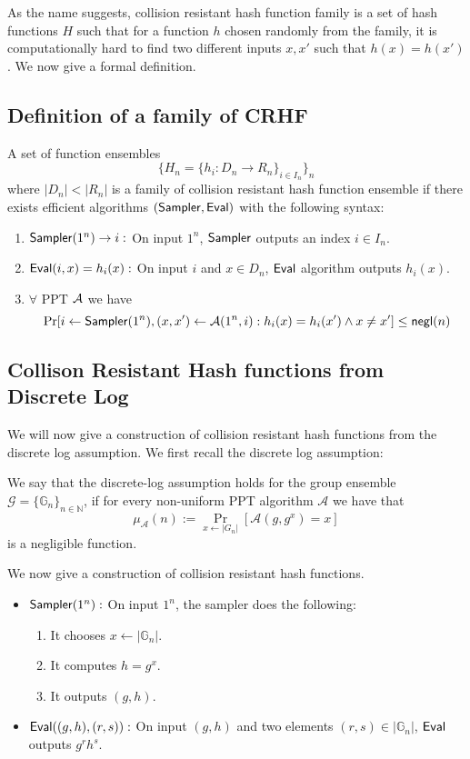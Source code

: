 As the name suggests, collision resistant hash function family is a set of hash functions $H$ such that for a function $h$ chosen randomly from the family, it is computationally hard to find two different inputs $x,x'$ such that $h(x) = h(x')$. We now give a formal definition.

\subsection{Definition of a family of CRHF}

A set of function ensembles
\[ \{H_n = \{h_i : D_n \to R_n \}_{i \in I_n} \}_n\]
where $|D_n| < |R_n|$ is a family of collision resistant hash function ensemble if there exists efficient algorithms $(\mathsf{Sampler},\mathsf{Eval})$ with the following syntax:
\begin{enumerate}
\item $\mathsf{Sampler}(1^n) \to i:$ On input $1^n$, $\mathsf{Sampler}$ outputs an index $i \in I_n$.
\item $\mathsf{Eval}(i,x) = h_i(x):$ On input $i$ and $x \in D_n$, $\mathsf{Eval}$ algorithm outputs $h_i(x)$. 
\item $\forall$ PPT $\mathcal{A}$ we have
\[\Pr[i \gets \mathsf{Sampler}(1^n), (x,x') \gets \mathcal{A}(1^n,i) : h_i(x) = h_i(x') \wedge x \neq x'] \leq \mathsf{negl}(n)\]
\end{enumerate}


\subsection{Collison Resistant Hash functions from Discrete Log}
We will now give a construction of collision resistant hash functions from the discrete log assumption. We first recall the discrete log assumption:
\begin{definition}
We say that the discrete-log assumption holds for the group ensemble $\mathcal{G} =\{ \mathbb{G}_n\}_{n \in \mathbb{N}}$, if for every non-uniform PPT algorithm $\mathcal{A}$ we have that
\[\mu_\mathcal{A}(n) := \Pr_{x \leftarrow |G_n|}[\mathcal{A}(g,g^x) = x]\]
is a negligible function.
\end{definition}

We now give a construction of collision resistant hash functions.  

\begin{itemize}
\item $\mathsf{Sampler}(1^n):$ On input $1^n$, the sampler does the following:
\begin{enumerate}
    \item It chooses $x \gets |\mathbb{G}_n|$.
    \item It computes $h = g^x$.
    \item It outputs $(g,h)$.

\end{enumerate}
\item $\mathsf{Eval}((g,h),(r,s)):$ On input $(g,h)$ and two elements $(r,s) \in |\mathbb{G}_n|$, $\mathsf{Eval}$ outputs $g^rh^s$.
\end{itemize}

